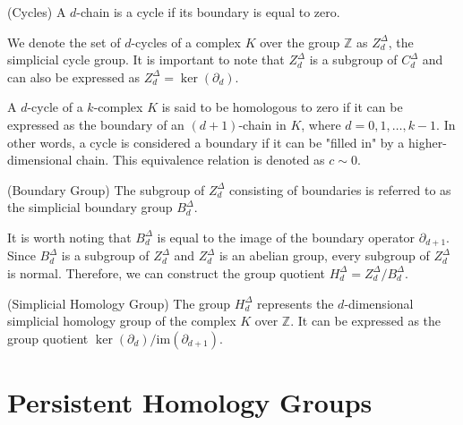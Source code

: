 \begin{definition}{(Cycles) \cite[p.106]{hatcher2005algebraic}}
A $d$-chain is a cycle if its boundary is equal to zero.
\end{definition}

We denote the set of $d$-cycles of a complex $K$ over the group $\mathbb{Z}$ as $Z^\Delta_d$, the simplicial cycle group. It is important to note that $Z^\Delta_d$ is a subgroup of $C^\Delta_d$ and can also be expressed as $Z^\Delta_d = \ker(\partial_d)$.

A $d$-cycle of a $k$-complex $K$ is said to be homologous to zero if it can be expressed as the boundary of an $(d+1)$-chain in $K$, where $d=0,1,\ldots,k-1$. In other words, a cycle is considered a boundary if it can be "filled in" by a higher-dimensional chain. This equivalence relation is denoted as $c \sim 0$.

\begin{definition}{(Boundary Group) \cite[§2.3]{zomorodian2004computing}}
The subgroup of $Z^\Delta_d$ consisting of boundaries is referred to as the simplicial boundary group $B^\Delta_d$.
\end{definition}

It is worth noting that $B^\Delta_d$ is equal to the image of the boundary operator $\partial_{d+1}$. Since $B^\Delta_d$ is a subgroup of $Z^\Delta_d$ and $Z^\Delta_d$ is an abelian group, every subgroup of $Z^\Delta_d$ is normal. Therefore, we can construct the group quotient $H^\Delta_d = Z^\Delta_d / B^\Delta_d$.

\begin{definition}{(Simplicial Homology Group) \cite[§2.1]{hatcher2005algebraic}}
The group $H^\Delta_d$ represents the $d$-dimensional simplicial homology group of the complex $K$ over $\mathbb{Z}$. It can be expressed as the group quotient $\ker(\partial_d) / \text{im}(\partial_{d+1})$.
\end{definition}

\section{Persistent Homology Groups}

